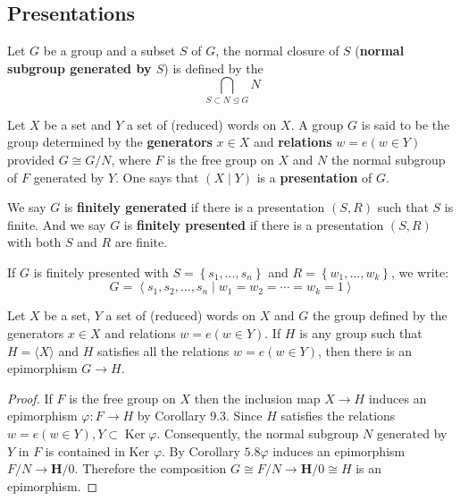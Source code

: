 \subsection{Presentations}
\begin{lemma}
    Let $G$ be a group and a subset $S$ of $G$, the normal closure of $S$ (\textbf{normal subgroup generated by $S$}) is defined by the
    \begin{equation*}
        \bigcap_{S\subset N\unlhd G}N
    \end{equation*}
\end{lemma}

\begin{definition}
    Let $X$ be a set and $Y$ a set of (reduced) words on $X$.
    A group $G$ is said to be the group determined by the \textbf{generators} $x \in X$ and \textbf{relations} $w=e (w\in Y)$ provided $G \cong G / N$, where $F$ is the free group on $X$ and $N$ the normal subgroup of $F$ generated by $Y$.
    One says that $(X \mid Y)$ is a \textbf{presentation} of $G$.

    We say $G$ is \textbf{finitely generated} if there is a presentation $(S, R)$ such that $S$ is finite. And we say $G$ is \textbf{finitely presented} if there is a presentation $(S, R)$ with both $S$ and $R$ are finite.

    If $G$ is finitely presented with $S=\left\{s_1, \ldots, s_n\right\}$ and $R=\left\{w_1, \ldots, w_k\right\}$, we write:
    \[
        G=\left\langle s_1, s_2, \ldots, s_n \mid w_1=w_2=\cdots=w_k=1\right\rangle
    \]
\end{definition}

\begin{theorem}
    Let $X$ be a set, $Y$ a set of (reduced) words on $X$ and $G$ the group defined by the generators $x \in X$ and relations $w=e (w\in Y)$.
    If $H$ is any group such that $H=\langle X \rangle$ and $H$ satisfies all the relations $w=e(w \in Y)$, then there is an epimorphism $G \rightarrow H$.
    \begin{proof}
        If $F$ is the free group on $X$ then the inclusion map $X \rightarrow H$ induces an epimorphism $\varphi: F \rightarrow H$ by Corollary 9.3. Since $H$ satisfies the relations $w=e(w \in Y), Y \subset \operatorname{Ker} \varphi$. Consequently, the normal subgroup $N$ generated by $Y$ in $F$ is contained in Ker $\varphi$. By Corollary $5.8 \varphi$ induces an epimorphism $F / N \rightarrow \mathbf{H} / 0$. Therefore the composition $G \cong F / N \rightarrow \mathbf{H} / 0 \cong H$ is an epimorphism.
    \end{proof}
\end{theorem}



